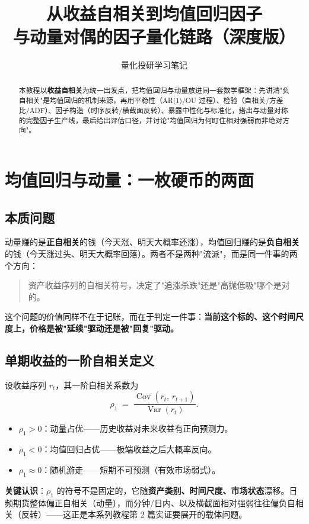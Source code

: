\documentclass[UTF8,11pt]{ctexart}
\title{\bfseries 从收益自相关到均值回归因子\\[2pt]\large 与动量对偶的因子量化链路（深度版）}
\author{量化投研学习笔记}
\date{}
\begin{document}
\maketitle

\begin{abstract}
本教程以\textbf{收益自相关}为统一出发点，把均值回归与动量放进同一套数学框架：先讲清"负自相关"是均值回归的机制来源，再用平稳性（AR(1)/OU 过程）、检验（自相关/方差比/ADF）、因子构造（时序反转/横截面反转）、暴露中性化与标准化，搭出与动量对称的完整因子生产线，最后给出评估口径，并讨论"均值回归为何盯住相对强弱而非绝对方向"。
\end{abstract}

\tableofcontents
\newpage

\section{均值回归与动量：一枚硬币的两面}

\subsection{本质问题}
动量赚的是\textbf{正自相关}的钱（今天涨、明天大概率还涨），均值回归赚的是\textbf{负自相关}的钱（今天涨过头、明天大概率回落）。两者不是两种"流派"，而是同一件事的两个方向：
\begin{quote}
资产收益序列的自相关符号，决定了"追涨杀跌"还是"高抛低吸"哪个是对的。
\end{quote}
这个问题的价值同样不在于记账，而在于判定一件事：\textbf{当前这个标的、这个时间尺度上，价格是被"延续"驱动还是被"回复"驱动。}

\subsection{单期收益的一阶自相关定义}
设收益序列 $r_t$，其一阶自相关系数为
\begin{equation}
\rho_1 \;=\; \frac{\operatorname{Cov}(r_t,\,r_{t+1})}{\operatorname{Var}(r_t)}.
\end{equation}
\begin{itemize}[itemsep=2pt]
\item $\rho_1 > 0$：动量占优——历史收益对未来收益有正向预测力。
\item $\rho_1 < 0$：均值回归占优——极端收益之后大概率反向。
\item $\rho_1 \approx 0$：随机游走——短期不可预测（有效市场弱式）。
\end{itemize}
\textbf{关键认识}：$\rho_1$ 的符号不是固定的，它随\textbf{资产类别、时间尺度、市场状态}漂移。日频期货整体偏正自相关（动量），而分钟/日内、以及横截面相对强弱往往偏负自相关（反转）——这正是本系列教程第 2 篇实证要展开的载体问题。
\end{document}
